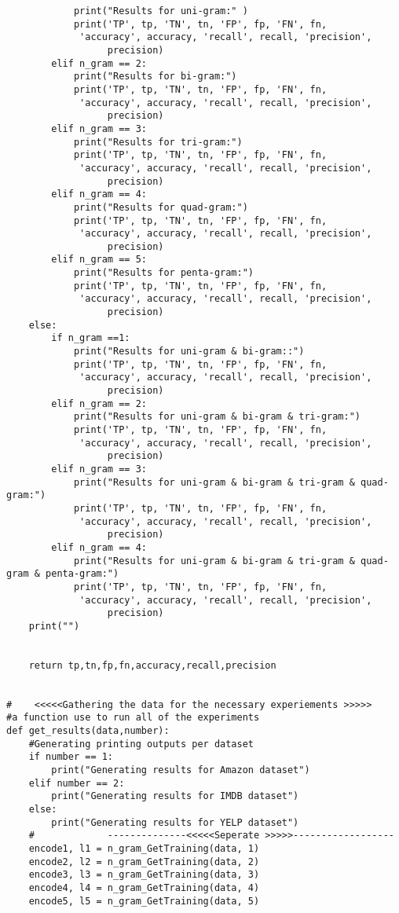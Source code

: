 \documentclass[12pt]{article}
\begin{document}
\begin{enumerate}
\begin{flushleft}
\begin{lstlisting}
            print("Results for uni-gram:" )
            print('TP', tp, 'TN', tn, 'FP', fp, 'FN', fn,
             'accuracy', accuracy, 'recall', recall, 'precision',
                  precision)
        elif n_gram == 2:
            print("Results for bi-gram:")
            print('TP', tp, 'TN', tn, 'FP', fp, 'FN', fn,
             'accuracy', accuracy, 'recall', recall, 'precision',
                  precision)
        elif n_gram == 3:
            print("Results for tri-gram:")
            print('TP', tp, 'TN', tn, 'FP', fp, 'FN', fn,
             'accuracy', accuracy, 'recall', recall, 'precision',
                  precision)
        elif n_gram == 4:
            print("Results for quad-gram:")
            print('TP', tp, 'TN', tn, 'FP', fp, 'FN', fn,
             'accuracy', accuracy, 'recall', recall, 'precision',
                  precision)
        elif n_gram == 5:
            print("Results for penta-gram:")
            print('TP', tp, 'TN', tn, 'FP', fp, 'FN', fn,
             'accuracy', accuracy, 'recall', recall, 'precision',
                  precision)
    else:
        if n_gram ==1:
            print("Results for uni-gram & bi-gram::")
            print('TP', tp, 'TN', tn, 'FP', fp, 'FN', fn,
             'accuracy', accuracy, 'recall', recall, 'precision',
                  precision)
        elif n_gram == 2:
            print("Results for uni-gram & bi-gram & tri-gram:")
            print('TP', tp, 'TN', tn, 'FP', fp, 'FN', fn,
             'accuracy', accuracy, 'recall', recall, 'precision',
                  precision)
        elif n_gram == 3:
            print("Results for uni-gram & bi-gram & tri-gram & quad-gram:")
            print('TP', tp, 'TN', tn, 'FP', fp, 'FN', fn,
             'accuracy', accuracy, 'recall', recall, 'precision',
                  precision)
        elif n_gram == 4:
            print("Results for uni-gram & bi-gram & tri-gram & quad-gram & penta-gram:")
            print('TP', tp, 'TN', tn, 'FP', fp, 'FN', fn,
             'accuracy', accuracy, 'recall', recall, 'precision',
                  precision)
    print("")


    return tp,tn,fp,fn,accuracy,recall,precision


#    <<<<<Gathering the data for the necessary experiements >>>>>
#a function use to run all of the experiments
def get_results(data,number):
    #Generating printing outputs per dataset
    if number == 1:
        print("Generating results for Amazon dataset")
    elif number == 2:
        print("Generating results for IMDB dataset")
    else:
        print("Generating results for YELP dataset")
    #             --------------<<<<<Seperate >>>>>------------------
    encode1, l1 = n_gram_GetTraining(data, 1)
    encode2, l2 = n_gram_GetTraining(data, 2)
    encode3, l3 = n_gram_GetTraining(data, 3)
    encode4, l4 = n_gram_GetTraining(data, 4)
    encode5, l5 = n_gram_GetTraining(data, 5)


\end{lstlisting}
\end{flushleft}
\end{enumerate}
\end{document}

